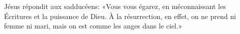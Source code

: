 \encetemps Jésus répondit aux sadducéens:
	«Vous vous égarez, en méconnaissant les Écritures et la puissance de Dieu.
À la résurrection, en effet, on ne prend ni femme ni mari,
	mais on est comme les anges dans le ciel.»
